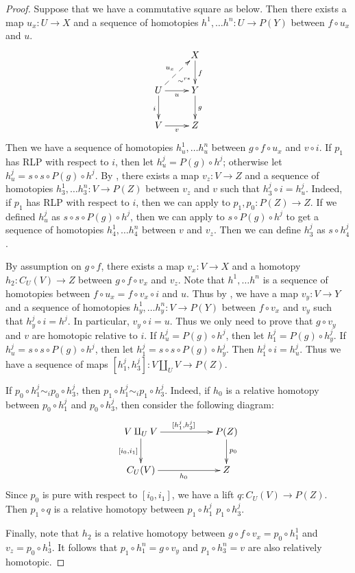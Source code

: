 \documentclass{tac}
\theoremstyle{definition}
\newcommand{\cyli}{i}
\begin{document}
\begin{proof}
Suppose that we have a commutative square as below.
Then there exists a map $u_x : U \to X$ and a sequence of homotopies $h^1, \ldots h^n : U \to P(Y)$ between $f \circ u_x$ and $u$.
\[ \xymatrix{   \ar@{}[dr]|(.7){\sim^{r*}}            & X \ar[d]^f \\
              U \ar@{-->}[ur]^{u_x} \ar[d]_i \ar[r]_u & Y \ar[d]^g \\
              V \ar[r]_v                              & Z
            } \]
Then we have a sequence of homotopies $h^1_u, \ldots h^n_u$ between $g \circ f \circ u_x$ and $v \circ i$.
If $p_1$ has RLP with respect to $i$, then let $h^j_u = P(g) \circ h^j$; otherwise let $h^j_u = s \circ s \circ P(g) \circ h^j$.
By , there exists a map $v_z : V \to Z$ and a sequence of homotopies $h^1_3, \ldots h^n_3 : V \to P(Z)$ between $v_z$ and $v$ such that $h^j_3 \circ i = h^j_u$.
Indeed, if $p_1$ has RLP with respect to $i$, then we can apply  to $p_1,p_0 : P(Z) \to Z$.
If we defined $h^j_u$ as $s \circ s \circ P(g) \circ h^j$, then we can apply  to $s \circ P(g) \circ h^j$ to get a sequence of homotopies $h^1_4, \ldots h^n_4$ between $v$ and $v_z$.
Then we can define $h^j_3$ as $s \circ h^j_4$.

By assumption on $g \circ f$, there exists a map $v_x : V \to X$ and a homotopy $h_2 : C_U(V) \to Z$ between $g \circ f \circ v_x$ and $v_z$.
Note that $h^1, \ldots h^n$ is a sequence of homotopies between $f \circ u_x = f \circ v_x \circ i$ and $u$.
Thus by , we have a map $v_y : V \to Y$ and a sequence of homotopies $h^1_y, \ldots h^n_y : V \to P(Y)$ between $f \circ v_x$ and $v_y$ such that $h^j_y \circ i = h^j$.
In particular, $v_y \circ i = u$.
Thus we only need to prove that $g \circ v_y$ and $v$ are homotopic relative to $i$.
If $h^j_u = P(g) \circ h^j$, then let $h^j_1 = P(g) \circ h^j_y$.
If $h^j_u = s \circ s \circ P(g) \circ h^j$, then let $h^j_1 = s \circ s \circ P(g) \circ h^j_y$.
Then $h^j_1 \circ i = h^j_u$.
Thus we have a sequence of maps $[h^j_1,h^j_3] : V \amalg_U V \to P(Z)$.

If $p_0 \circ h^j_1 \sim_i p_0 \circ h^j_3$, then $p_1 \circ h^j_1 \sim_i p_1 \circ h^j_3$.
Indeed, if $h_0$ is a relative homotopy between $p_0 \circ h^j_1$ and $p_0 \circ h^j_3$, then consider the following diagram:
\[ \xymatrix{ V \amalg_U V \ar[rr]^{[h^j_1, h^j_3]} \ar[d]_{[\cyli_0,\cyli_1]} & & P(Z) \ar[d]^{p_0} \\
              C_U(V) \ar[rr]_{h_0} & & Z
            } \]
Since $p_0$ is pure with respect to $[\cyli_0,\cyli_1]$, we have a lift $q : C_U(V) \to P(Z)$.
Then $p_1 \circ q$ is a relative homotopy between $p_1 \circ h^j_1$ $p_1 \circ h^j_3$.

Finally, note that $h_2$ is a relative homotopy between $g \circ f \circ v_x = p_0 \circ h^1_1$ and $v_z = p_0 \circ h^1_3$.
It follows that $p_1 \circ h^n_1 = g \circ v_y$ and $p_1 \circ h^n_3 = v$ are also relatively homotopic.
\end{proof}
\end{document}
